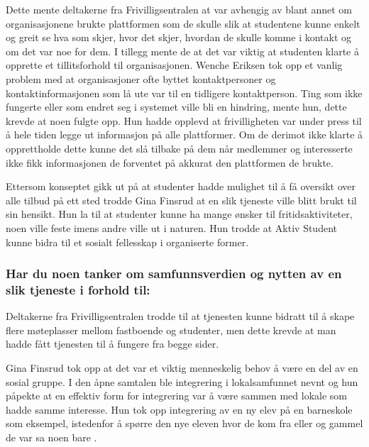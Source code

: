 Dette mente deltakerne fra Frivilligsentralen at var avhengig av blant annet om organisasjonene brukte plattformen som de skulle slik at studentene kunne enkelt og greit se hva som skjer, hvor det skjer, hvordan de skulle komme i kontakt og om det var noe for dem. I tillegg mente de at det var viktig at studenten klarte å opprette et tillitsforhold til organisasjonen. Wenche Eriksen tok opp et vanlig problem med at organisasjoner ofte byttet kontaktpersoner og kontaktinformasjonen som lå ute var til en tidligere kontaktperson. Ting som ikke fungerte eller som endret seg i systemet ville bli en hindring, mente hun, dette krevde at noen fulgte opp. Hun hadde opplevd at frivilligheten var under press til å hele tiden legge ut informasjon på alle plattformer. Om de derimot ikke klarte å opprettholde dette kunne det slå tilbake på dem når medlemmer og interesserte ikke fikk informasjonen de forventet på akkurat den plattformen de brukte. \cite{FRIVILLIGSENTRALEN-INTERVJU:21}

Ettersom konseptet gikk ut på at studenter hadde mulighet til å få oversikt over alle tilbud på ett sted trodde Gina Finsrud at en slik tjeneste ville blitt brukt til sin hensikt. Hun la til at studenter kunne ha mange ønsker til fritidsaktiviteter, noen ville feste imens andre ville ut i naturen. Hun trodde at Aktiv Student kunne bidra til et sosialt fellesskap i organiserte former. \cite{KOMMUNEN-INTERVJU:20}

\setlength{\leftskip}{0pt}

\subsubsection{Har du noen tanker om samfunnsverdien og nytten av en slik tjeneste i forhold til:}

\setlength{\leftskip}{2em}
Deltakerne fra Frivilligsentralen trodde til at tjenesten kunne bidratt til å skape flere møteplasser mellom fastboende og studenter, men dette krevde at man hadde fått tjenesten til å fungere fra begge sider. \cite{FRIVILLIGSENTRALEN-INTERVJU:21}

Gina Finsrud tok opp at det var et viktig menneskelig behov å være en del av en sosial gruppe. I den åpne samtalen ble integrering i lokalsamfunnet nevnt og hun påpekte at en effektiv form for integrering var å være sammen med lokale som hadde samme interesse. Hun tok opp integrering av en ny elev på en barneskole som eksempel, istedenfor å spørre den nye eleven hvor de kom fra eller og gammel de var sa noen bare . \cite{KOMMUNEN-INTERVJU:20}

